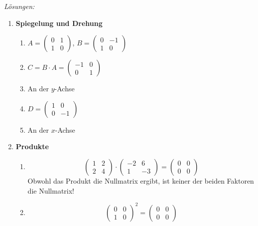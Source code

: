 \clearpage
\emph{Lösungen:}
\begin{enumerate}
    \item \textbf{Spiegelung und Drehung}
    \begin{enumerate}
        \item \( A = \begin{pmatrix} 0 & 1 \\ 1 & 0 \end{pmatrix} \), \quad \( B = \begin{pmatrix} 0 & -1 \\ 1 & 0 \end{pmatrix} \)
        \item \( C = B \cdot A = \begin{pmatrix} -1 & 0 \\ 0 & 1 \end{pmatrix} \)
        \item An der $y$-Achse
        \item \( D = \begin{pmatrix} 1 & 0 \\ 0 & -1 \end{pmatrix} \)
        \item An der $x$-Achse
    \end{enumerate}

    \item \textbf{Produkte}
    \begin{enumerate}
        \item \[
        \begin{pmatrix} 1 & 2 \\ 2 & 4 \end{pmatrix} 
        \cdot 
        \begin{pmatrix} -2 & 6 \\ 1 & -3 \end{pmatrix} 
        =
        \begin{pmatrix} 0 & 0 \\ 0 & 0 \end{pmatrix}
        \]
        Obwohl das Produkt die Nullmatrix ergibt, ist keiner der beiden Faktoren die Nullmatrix!
        \item \[
        \begin{pmatrix} 0 & 0 \\ 1 & 0 \end{pmatrix}^2 
        =
        \begin{pmatrix} 0 & 0 \\ 0 & 0 \end{pmatrix}
        \]
    \end{enumerate}


\end{enumerate}
